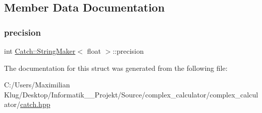 \subsection{Member Data Documentation}
\mbox{\label{struct_catch_1_1_string_maker_3_01float_01_4_a54ebebe76a755dbe2dd8ad409c329378}} 
\subsubsection{\texorpdfstring{precision}{precision}}
{\footnotesize\ttfamily int \mbox{\hyperlink{struct_catch_1_1_string_maker}{Catch\+::\+String\+Maker}}$<$ float $>$\+::precision\hspace{0.3cm}{\ttfamily [static]}}



The documentation for this struct was generated from the following file\+:\begin{DoxyCompactItemize}
\item 
C\+:/\+Users/\+Maximilian Klug/\+Desktop/\+Informatik\+\_\+\_\+\+Projekt/\+Source/complex\+\_\+calculator/complex\+\_\+calculator/\mbox{\hyperlink{catch_8hpp}{catch.\+hpp}}\end{DoxyCompactItemize}
